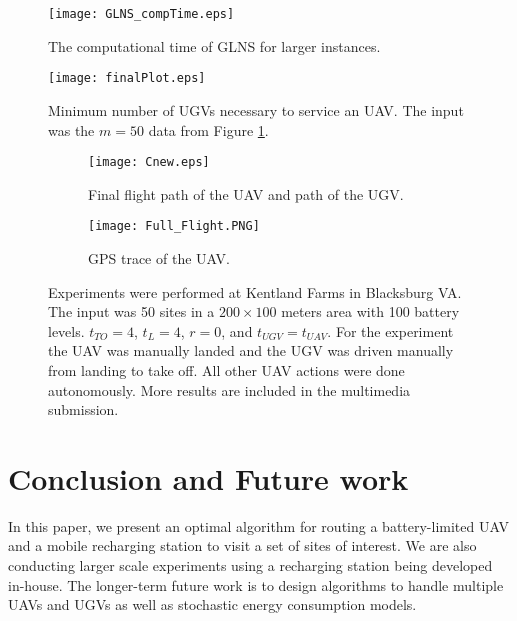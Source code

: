 \documentclass[letterpaper,10pt,conference]{ieeeconf}
\begin{document}
\begin{figure}[ht]
\centering
\texttt{[image: GLNS\_compTime.eps]}
\caption{The computational time of GLNS for larger instances.}
\label{fig:GLNS_compTime}
\end{figure}

\begin{figure}[ht]
\centering
\texttt{[image: finalPlot.eps]}
\caption{Minimum number of UGVs necessary to service an UAV. The input was the $m = 50$ data from Figure \ref{fig:GLNS_compTime}.}
\label{fig:ugvmin}
\end{figure}

\begin{figure}[ht]
\centering
\begin{subfigure}[b]{0.45\columnwidth}
\texttt{[image: Cnew.eps]}
\caption{Final flight path of the UAV and path of the UGV.}
\label{fig:kentInit}
\end{subfigure}
\begin{subfigure}[b]{0.45\columnwidth}
\texttt{[image: Full\_Flight.PNG]}
\caption{GPS trace of the UAV.}
\label{fig:realWorld}
\end{subfigure}
\caption{Experiments were performed at Kentland Farms in Blacksburg VA. The input was 50 sites in a $200 \times 100$ meters area with 100 battery levels. $t_{TO} = 4$, $t_{L} = 4$, $r = 0$, and $t_{UGV} = t_{UAV}$. For the experiment the UAV was manually landed and the UGV was driven manually from landing to take off. All other UAV actions were done autonomously. More results are included in the multimedia submission.}
\label{fig:kent}
\end{figure}

\section{Conclusion and Future work}
In this paper, we present an optimal algorithm for routing a battery-limited UAV and a mobile recharging station to visit a set of sites of interest. We are also conducting larger scale experiments using a recharging station being developed in-house. The longer-term future work is to design algorithms to handle multiple UAVs and UGVs as well as stochastic energy consumption models.




\end{document}

